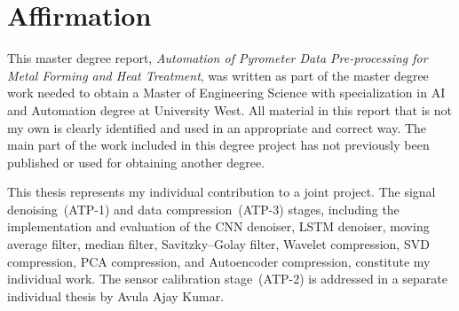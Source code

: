 \section*{Affirmation}
\vspace{-2ex}\titlerule\vspace{4ex}

This master degree report, \textit{Automation of Pyrometer Data Pre-processing for Metal Forming and Heat Treatment}, was written as part of the master degree work needed to obtain a Master of Engineering Science with specialization in AI and Automation degree at University West. All material in this report that is not my own is clearly identified and used in an appropriate and correct way. The main part of the work included in this degree project has not previously been published or used for obtaining another degree.

This thesis represents my individual contribution to a joint project. The signal denoising~(ATP-1) and data compression~(ATP-3) stages, including the implementation and evaluation of the CNN denoiser, LSTM denoiser, moving average filter, median filter, Savitzky--Golay filter, Wavelet compression, SVD compression, PCA compression, and Autoencoder compression, constitute my individual work. The sensor calibration stage~(ATP-2) is addressed in a separate individual thesis by Avula Ajay Kumar.

\vspace{1.5cm}

\newcommand*{\SignatureAndDate}[1]{%
    \par\noindent\makebox[2.5in]{\hrulefill} \hfill\makebox[2.0in]{\hrulefill}%
    \par\noindent\makebox[2.5in][l]{#1}      \hfill{}%
}%
\SignatureAndDate{Mallepalli Sravya Reddy}
